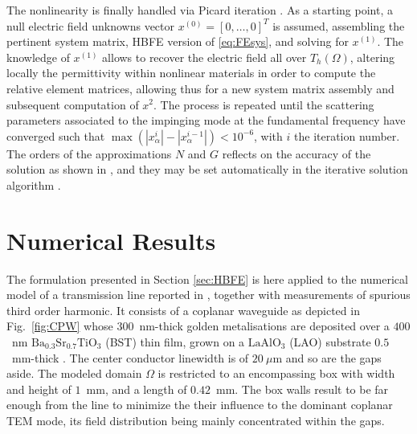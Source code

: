 \documentclass[AMA,STIX2COL]{WileyNJD-v2}
\begin{document}
The nonlinearity is finally handled via Picard iteration \cite{Ntibarikure2012}. As a starting point, a null electric field unknowns vector $x^{(0)}=[0,\ldots, 0]^T$ is assumed, assembling the pertinent system matrix, HBFE version of \eqref{eq:FEsys}, and solving for $x^{(1)}$. The knowledge of $x^{(1)}$ allows to recover the electric field all over $T_h(\Omega)$, altering locally the permittivity within nonlinear materials in order to compute the relative element matrices, allowing thus for a new system matrix assembly and subsequent computation of $x^2$. The process is repeated until the scattering parameters associated to the impinging mode at the fundamental frequency have converged such that $\max(|x^i_\alpha| - |x^{i-1}_\alpha|) < 10^{-6}$, with $i$ the iteration number. The orders of the approximations $N$ and $G$ reflects on the accuracy of the solution as shown in \cite{Ntibarikure2012}, and they may be set automatically in the iterative solution algorithm \cite{Gyselinck2002}.

\section{Numerical Results}
\label{sec:results}

The formulation presented in Section \ref{sec:HBFE}  is here applied to the numerical model of a transmission line reported in \cite{mateu2006measurements}, together with measurements of spurious third order harmonic. It consists of a coplanar waveguide as depicted in Fig.~\ref{fig:CPW} whose $300$~nm-thick golden metalisations are deposited over a $400$~nm $\text{Ba}_{0.3}\text{Sr}_{0.7}\text{TiO}_{3}$ (BST) thin film, grown on a $\text{LaAlO}_3$ (LAO) substrate $0.5$~mm-thick \cite{mateu2007frequency}. The center conductor linewidth is of $20~{\mu}$m and so are the gaps aside. The modeled domain $\Omega$ is restricted to an encompassing box with width and height of  $1$~mm, and a length of $0.42$~mm. The box walls result to be far enough from the line to minimize the their influence to the dominant coplanar TEM mode, its field distribution being mainly concentrated within the gaps.
\end{document}
